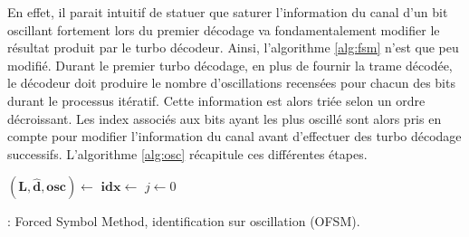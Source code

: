 En effet, il parait intuitif de statuer que saturer l'information du canal d'un bit oscillant fortement lors du 
premier décodage va fondamentalement modifier le résultat produit par le turbo décodeur. Ainsi, l'algorithme \ref{alg:fsm}
n'est que peu modifié. Durant le premier turbo décodage, en plus de fournir la trame décodée, le décodeur doit produire le 
nombre d'oscillations recensées pour chacun des bits durant le processus itératif. Cette information est alors triée 
selon un ordre décroissant. Les index associés aux bits ayant les plus oscillé sont alors pris en compte pour modifier 
l'information du canal avant d'effectuer des turbo décodage successifs. L'algorithme \ref{alg:osc} récapitule ces différentes 
étapes.
\begin{center}
\begin{minipage}{.9\textwidth}%
	\begin{algorithm}[H]
		\DontPrintSemicolon

		$\mathbf{(L,\hat{d},osc)} \gets$ \;
		$\mathbf{idx} \gets$ \;
		\;
		$j \gets 0$\;
	\caption{: Forced Symbol Method, identification sur oscillation (OFSM).}
	\label{alg:osc}
	\end{algorithm}
\end{minipage}
\end{center}

